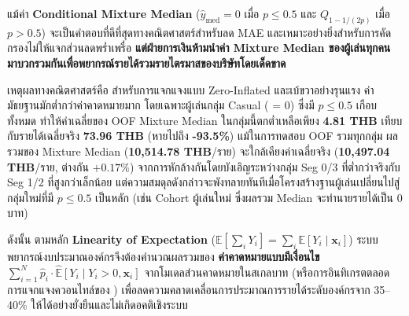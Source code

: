 \begin{warningbox}
แม้ค่า \textbf{Conditional Mixture Median} ($\hat{y}_{\text{med}} = 0$ เมื่อ $p \le 0.5$ และ $Q_{1 - 1/(2p)}$ เมื่อ $p > 0.5$) จะเป็นคำตอบที่ดีที่สุดทางคณิตศาสตร์สำหรับลด MAE และเหมาะอย่างยิ่งสำหรับการคัดกรองไม่ให้แจกส่วนลดพร่ำเพรื่อ \textbf{แต่ฝ่ายการเงินห้ามนำค่า Mixture Median ของผู้เล่นทุกคนมาบวกรวมกันเพื่อพยากรณ์รายได้รวมรายไตรมาสของบริษัทโดยเด็ดขาด}

เหตุผลทางคณิตศาสตร์คือ สำหรับการแจกแจงแบบ Zero-Inflated และเบ้ขวาอย่างรุนแรง ค่ามัธยฐานมักต่ำกว่าค่าคาดหมายมาก โดยเฉพาะผู้เล่นกลุ่ม Casual ( = 0) ซึ่งมี $p \le 0.5$ เกือบทั้งหมด ทำให้ค่าเฉลี่ยของ OOF Mixture Median ในกลุ่มนี้ตกต่ำเหลือเพียง \textbf{4.81 THB} เทียบกับรายได้เฉลี่ยจริง \textbf{73.96 THB} (หายไปถึง \textbf{-93.5\%}) แม้ในการทดสอบ OOF รวมทุกกลุ่ม ผลรวมของ Mixture Median (\textbf{10,514.78 THB}/ราย) จะใกล้เคียงค่าเฉลี่ยจริง (\textbf{10,497.04 THB}/ราย, ต่างกัน $+0.17\%$) จากการหักล้างกันโดยบังเอิญระหว่างกลุ่ม Seg 0/3 ที่ต่ำกว่าจริงกับ Seg 1/2 ที่สูงกว่าเล็กน้อย แต่ความสมดุลดังกล่าวจะพังทลายทันทีเมื่อโครงสร้างฐานผู้เล่นเปลี่ยนไปสู่กลุ่มใหม่ที่มี $p \le 0.5$ เป็นหลัก (เช่น Cohort ผู้เล่นใหม่ ซึ่งผลรวม Median จะทำนายรายได้เป็น 0 บาท)

ดังนั้น ตามหลัก \textbf{Linearity of Expectation} ($\mathbb{E}[\sum_i Y_i] = \sum_i \mathbb{E}[Y_i \mid \mathbf{x}_i]$) ระบบพยากรณ์งบประมาณองค์กรจึงต้องคำนวณผลรวมของ \textbf{ค่าคาดหมายแบบมีเงื่อนไข} $\sum_{i=1}^{N} \hat{p}_i \cdot \widehat{\mathbb{E}}[Y_i \mid Y_i > 0, \mathbf{x}_i]$ จากโมเดลส่วนคาดหมายในสเกลบาท (หรือการอินทิเกรตตลอดการแจกแจงควอนไทล์ของ ) เพื่อลดความคลาดเคลื่อนการประมาณการรายได้ระดับองค์กรจาก 35--40\% ให้ได้อย่างยั่งยืนและไม่เกิดอคติเชิงระบบ
\end{warningbox}
